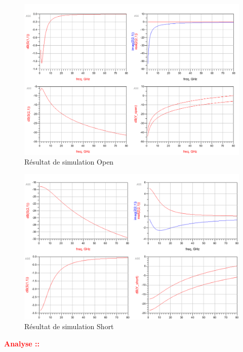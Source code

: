 \documentclass[a4paper]{article}
\begin{document}
\begin{figure}[!htb]
\begin{center}
  \includegraphics[scale=0.40]{de-embedding_open_sim.png}
  \caption{R\'esultat de simulation Open}
  \label{de-embedding-sim-open}
\end{center}
\end{figure}

\begin{figure}[!htb]
\begin{center}
  \includegraphics[scale=0.40]{de-embedding_short_sim.png}
  \caption{R\'esultat de simulation Short}
  \label{de-embedding-sim-short}
\end{center}
\end{figure}

\clearpage
\textbf{\textcolor{red}{Analyse :: }}
\end{document}
